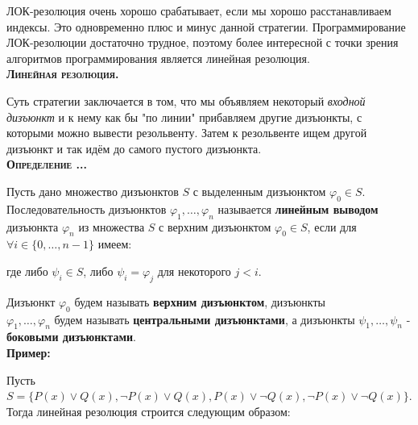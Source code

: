\documentclass[18pt, a4paper]{extarticle}
\newcounter{par}
\newcounter{spar}
\newcounter{zap}
\newcommand{\opr}{\textbf{\textsc{Определение \thepar.\if\thespar1\thespar.\fi\thezap.\;}}\stepcounter{zap}}
\newcommand{\bftex}[1]{\textbf{\textsc{#1}.}}
\newcommand{\centr}[1]{\makebox[\linewidth]{#1}}
\newcommand{\primer}{\textbf{Пример:\;}}
\newcommand{\vp}{\varphi}
\newcommand{\res}[2]{Res(#1,#2)}
\newcommand{\lot}[3]{#1_#2,\dots,#1_#3}
\begin{document}
ЛОК-резолюция очень хорошо срабатывает, если мы хорошо расстанавливаем индексы. Это одновременно плюс и минус данной стратегии. Программирование ЛОК-резолюции достаточно трудное, поэтому более интересной с точки зрения алгоритмов программирования является линейная резолюция.\\

\bftex{Линейная резолюция}

Суть стратегии заключается в том, что мы объявляем некоторый \textit{входной дизъюнкт} и к нему как бы "по линии"{} прибавляем другие дизъюнкты, с которыми можно вывести резольвенту. Затем к резольвенте ищем другой дизъюнкт и так идём до самого пустого дизъюнкта.\\

\opr 

Пусть дано множество дизъюнктов $S$ с выделенным дизъюнктом $\vp_0\in S$. Последовательность дизъюнктов $\lot \vp 1 n$ называется \textbf{линейным выводом} дизъюнкта $\vp_n$ из множества $S$ с верхним дизъюнктом $\vp_0\in S$, если для $\forall i\in\{0,\dots,n-1\}$ имеем:
\\\centr{$\vp_{i+1}=\res {\vp_i}{\psi_i}$,}

где либо $\psi_i\in S$, либо $\psi_i=\vp_j$ для некоторого $j<i$.

Дизъюнкт $\vp_0$ будем называть \textbf{верхним дизъюнктом}, дизъюнкты\\$\lot \vp 1 n$ будем называть \textbf{центральными дизъюнктами}, а дизъюнкты $\lot \psi 1 n$ - \textbf{боковыми дизъюнктами}.\\

\newpage
\primer

Пусть $S=\{P(x)\vee Q(x),\lnot P(x)\vee Q(x),P(x)\vee\lnot Q(x),\lnot P(x)\vee\lnot Q(x)\}$.\\

Тогда линейная резолюция строится следующим образом:
\end{document}
